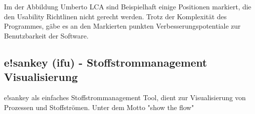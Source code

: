 \documentclass[a4paper, 12pt, twoside, BCOR=20mm, DIV=calc, abstracton, parskip=half*, toc=bibliography, toc=listof, headsepline, footsepline, headings=small, numbers=enddot]{scrreprt}
\begin{document}
Im der Abbildung Umberto LCA sind Beispielhaft einige Positionen markiert, die den Usability Richtlinen nicht gerecht werden. 
Trotz der Komplexität des Programmes, gäbe es an den Markierten punkten Verbesserungspotentiale zur Benutzbarkeit der Software. 


%
%
\subsection{e!sankey (ifu) - Stoffstrommanagement Visualisierung}
e!sankey als einfaches Stoffstrommanagement Tool, dient zur Visualisierung von Prozessen und Stoffströmen. Unter dem Motto "show the flow" 
\end{document}
